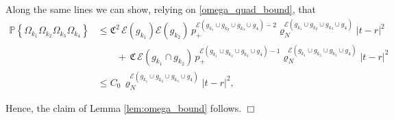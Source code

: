 \documentclass[11pt,reqno]{amsart}
\numberwithin{equation}{section}
\newcommand{\abs}[1]{\left\lvert #1 \right\rvert}
\newcommand{\pk}[1]{\mathbb{P} \left\{ #1 \right \} }
\newcommand{\nelem}[1]{{Lemma \ref{#1}}}
\newcommand{\QED}{\hfill $\Box$}
\begin{document}
Along the same lines we can show, relying on \eqref{omega_quad_bound}, that
\begin{align*}
    \pk{\Omega_{k_1}\Omega_{k_2}\Omega_{k_3}\Omega_{k_4}}&\leqslant {\mathfrak{C}^2}\,\mathcal{E}(g_{k_1})\mathcal{E}(g_{k_2})\,{p_+^{\mathcal{E}(g_{k_1}\cup g_{k_2}\cup g_{k_3}\cup g_4)-2}}\varrho_N^{\mathcal{E}(g_{k_1}\cup g_{k_2}\cup g_{k_3}\cup g_4)}\abs{t-r}^2\\
    &\qquad + \,{\mathfrak{C}}\,\mathcal{E}(g_{k_1}\cap g_{k_2})\,{p_+^{\mathcal{E}(g_{k_1}\cup g_{k_2}\cup g_{k_3}\cup g_4)-1}}\varrho_N^{\mathcal{E}(g_{k_1}\cup g_{k_2}\cup g_{k_3}\cup g_4)}\abs{t-r}^2\\
    &\leqslant C_0\,\varrho_N^{\mathcal{E}(g_{k_1}\cup g_{k_2}\cup g_{k_3}\cup g_4)}\abs{t-r}^2,
\end{align*}

Hence, the claim of \nelem{lem:omega_bound} follows.
\QED

\medskip
\end{document}
